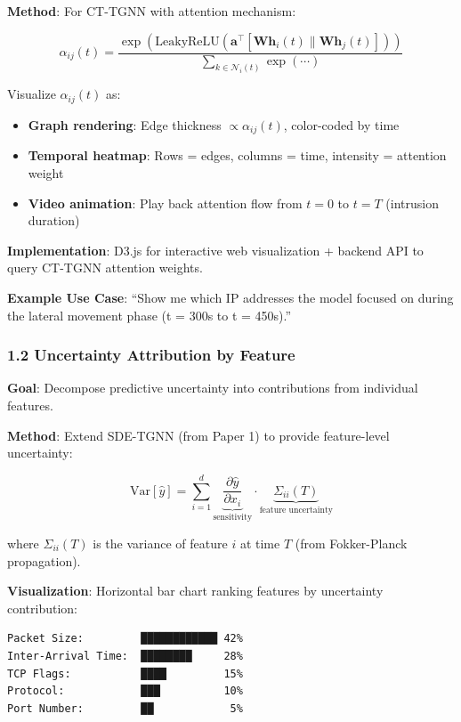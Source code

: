 \documentclass[11pt]{article}
\begin{document}
\textbf{Method}: For CT-TGNN with attention mechanism:

\begin{equation}
\alpha_{ij}(t) = \frac{\exp\left(\text{LeakyReLU}\left(\mathbf{a}^\top [\mathbf{W}\mathbf{h}_i(t) \| \mathbf{W}\mathbf{h}_j(t)]\right)\right)}{\sum_{k \in \mathcal{N}_i(t)} \exp(\cdots)}
\end{equation}

Visualize $\alpha_{ij}(t)$ as:
\begin{itemize}
    \item \textbf{Graph rendering}: Edge thickness $\propto \alpha_{ij}(t)$, color-coded by time
    \item \textbf{Temporal heatmap}: Rows = edges, columns = time, intensity = attention weight
    \item \textbf{Video animation}: Play back attention flow from $t = 0$ to $t = T$ (intrusion duration)
\end{itemize}

\textbf{Implementation}: D3.js for interactive web visualization + backend API to query CT-TGNN attention weights.

\textbf{Example Use Case}: ``Show me which IP addresses the model focused on during the lateral movement phase (t = 300s to t = 450s).''

\subsubsection{1.2 Uncertainty Attribution by Feature}

\textbf{Goal}: Decompose predictive uncertainty into contributions from individual features.

\textbf{Method}: Extend SDE-TGNN (from Paper 1) to provide feature-level uncertainty:

\begin{equation}
\text{Var}[\hat{y}] = \sum_{i=1}^{d} \underbrace{\frac{\partial \hat{y}}{\partial x_i}}_{\text{sensitivity}} \cdot \underbrace{\Sigma_{ii}(T)}_{\text{feature uncertainty}}
\end{equation}

where $\Sigma_{ii}(T)$ is the variance of feature $i$ at time $T$ (from Fokker-Planck propagation).

\textbf{Visualization}: Horizontal bar chart ranking features by uncertainty contribution:
\begin{verbatim}
Packet Size:         ████████████ 42%
Inter-Arrival Time:  ████████     28%
TCP Flags:           ████         15%
Protocol:            ███          10%
Port Number:         ██            5%
\end{verbatim}
\end{document}
